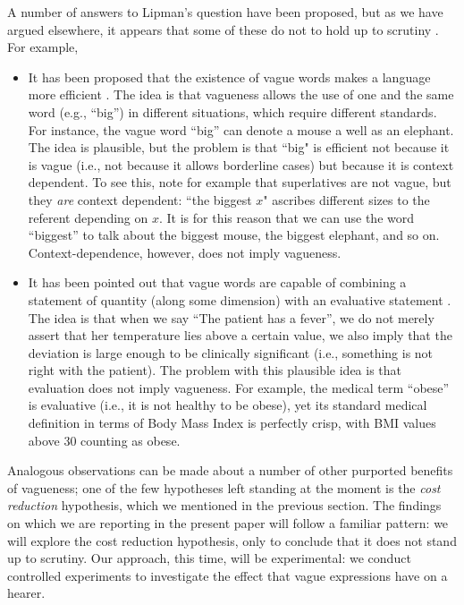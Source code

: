 A number of answers to Lipman's question have been proposed, but as we have argued elsewhere, it appears that some of these do not to hold up to scrutiny \citep{van2009utility,vanDeemterBook}. For example,
%
\begin{itemize}
\item It has been proposed that the existence of vague words makes a language more efficient \citep{barwiseperry}. The idea is that vagueness allows the use of one and the same word (e.g., ``big'') in different situations, which require different standards. For instance, the vague word ``big'' can denote a mouse a well as an elephant. The idea is plausible, but the problem is that ``big" is efficient not because it is vague (i.e., not because it allows borderline cases) but because it is context dependent. To see this, note for example that superlatives are not vague, but they {\em are} context dependent: ``the biggest $x$" ascribes different sizes to the referent depending on $x$. It is for this reason that we can use the word ``biggest''  to talk about the biggest mouse, the biggest elephant, and so on. Context-dependence, however, does not imply vagueness.
%
\item It has been pointed out that vague words are capable of combining a statement of quantity (along some dimension) with an evaluative statement \citep{veltman}. The idea is that when we say ``The patient has a fever'', we do not merely assert that her temperature lies above a certain value, we also imply that the deviation is large enough to be clinically significant (i.e., something is not right with the patient). The problem with this plausible idea is that evaluation does not imply vagueness. For example, the medical term ``obese'' is evaluative (i.e., it is not healthy to be obese), yet its standard medical definition in terms of Body Mass Index is perfectly crisp, with BMI values above 30 counting as obese.
\end{itemize}
%
Analogous observations can be made about a number of other purported benefits of vagueness; one of the few hypotheses left standing at the moment is the {\em cost reduction} hypothesis, which we mentioned in the previous section. The findings on which we are reporting in the present paper will follow a familiar pattern: we will explore the cost reduction hypothesis, only to conclude that it does not stand up to scrutiny. Our approach, this time, will be experimental: we conduct controlled experiments to investigate the effect that vague expressions have on a hearer. 

